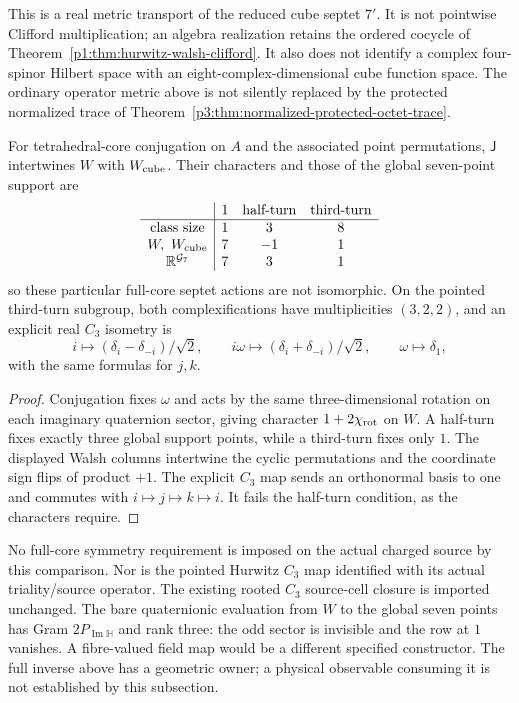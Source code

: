 \documentclass[11pt,a4paper]{article}
\begin{document}
This is a real metric transport of the reduced cube septet \(7'\).
It is not pointwise Clifford multiplication; an algebra realization
retains the ordered cocycle of
Theorem~\ref{p1:thm:hurwitz-walsh-clifford}. It also does not identify
a complex four-spinor Hilbert space with an eight-complex-dimensional
cube function space. The ordinary operator metric above is not silently
replaced by the protected normalized trace of
Theorem~\ref{p3:thm:normalized-protected-octet-trace}.

\begin{proposition}
\label{p3b:prop:exroot-septet-characters}
For tetrahedral-core conjugation on \(A\) and the associated point
permutations, \(\mathsf J\) intertwines \(W\) with \(W_{\rm cube}\).
Their characters and those of the global seven-point support are
\[
\begin{array}{c|ccc}
 &1&\text{half-turn}&\text{third-turn}\\ \hline
 \text{class size}&1&3&8\\
 W,\ W_{\rm cube}&7&-1&1\\
 \mathbb R^{\mathcal G_7}&7&3&1
\end{array}
\]
so these particular full-core septet actions are not isomorphic.
On the pointed third-turn subgroup, both complexifications have
multiplicities \((3,2,2)\), and an explicit real \(C_3\) isometry is
\[
 i\mapsto(\delta_i-\delta_{-i})/\sqrt2,\qquad
 i\omega\mapsto(\delta_i+\delta_{-i})/\sqrt2,\qquad
 \omega\mapsto\delta_1,
\]
with the same formulas for \(j,k\).
\end{proposition}
\begin{proof}
Conjugation fixes \(\omega\) and acts by the same three-dimensional
rotation on each imaginary quaternion sector, giving character
\(1+2\chi_{\rm rot}\) on \(W\). A half-turn fixes exactly three
global support points, while a third-turn fixes only \(1\).
The displayed Walsh columns intertwine the cyclic permutations and
the coordinate sign flips of product \(+1\).
The explicit \(C_3\) map sends an orthonormal basis to one and
commutes with \(i\mapsto j\mapsto k\mapsto i\).
It fails the half-turn condition, as the characters require.
\end{proof}

No full-core symmetry requirement is imposed on the actual charged
source by this comparison. Nor is the pointed Hurwitz \(C_3\) map
identified with its actual triality/source operator. The existing
rooted \(C_3\) source-cell closure is imported unchanged.
The bare quaternionic evaluation from \(W\) to the global seven
points has Gram \(2P_{\operatorname{Im}\mathbb H}\) and rank three:
the odd sector is invisible and the row at \(1\) vanishes.
A fibre-valued field map would be a different specified constructor.
The full inverse above has a geometric owner; a physical observable
consuming it is not established by this subsection.
\end{document}
